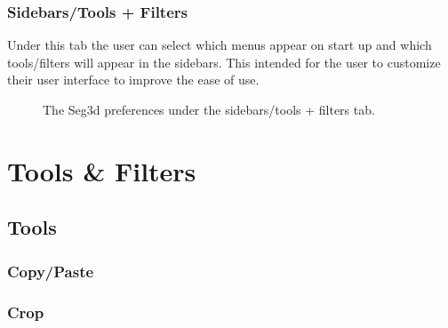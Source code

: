 \documentclass[fleqn,11pt,openany]{book}
\begin{document}
\subsection{Sidebars/Tools + Filters}
Under this tab the user can select which menus appear on start up and which tools/filters will appear in the 
sidebars.  This intended for the user to customize their user interface to improve the ease of use.

\begin{figure}[h!]
\caption{The Seg3d preferences under the sidebars/tools + filters tab.}\label{fig:Pref_side}
\end{figure}

\chapter{Tools \& Filters}

\begin{introduction}

\end{introduction}

\section{Tools}

\subsection{Copy/Paste}

\subsection{Crop}
\end{document}
